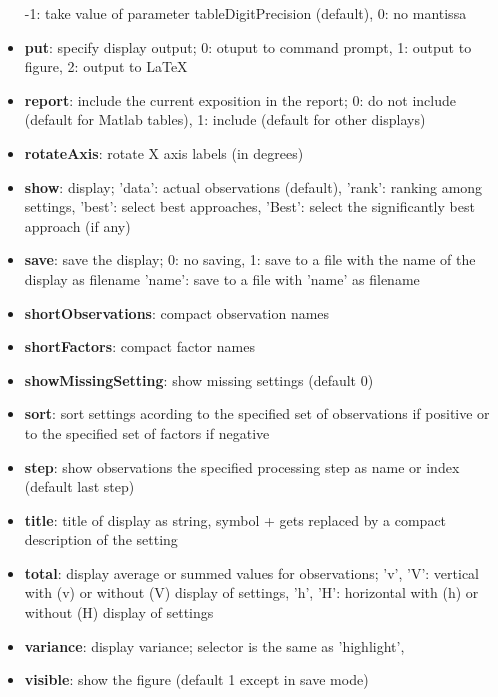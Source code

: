 \documentclass[a4paper,fleqn]{tufte-handout}
\begin{document}
\begin{itemize}
           -1: take value of  parameter tableDigitPrecision (default),
           0: no mantissa                  
\item \textbf{put}: specify display output;
    	0: otuput to command prompt,
    	1: output to figure,
    	2: output to \LaTeX 
\item \textbf{report}:  include the current exposition in the report;
       0: do not include (default for Matlab tables),  
       1: include (default for other displays)                   
\item \textbf{rotateAxis}: rotate X axis labels (in degrees)   
\item \textbf{show}: display;
        'data': actual observations (default),
        'rank': ranking among settings,
        'best': select best approaches,
        'Best': select the significantly best approach (if any)                 
\item \textbf{save}: save the display;
    	0: no saving,
    	1: save to a file with the name of the display as filename
    	'name': save to a file with 'name' as filename
\item \textbf{shortObservations}: compact observation names                 
\item \textbf{shortFactors}: compact factor names  
\item \textbf{showMissingSetting}:  show missing settings (default 0)                
\item \textbf{sort}:   sort settings acording to the specified set of observations if
        positive or to the specified set of factors if negative
\item \textbf{step}: show observations the specified processing step as name or
    index (default last step)                 
\item \textbf{title}: title of display as string,
    	symbol + gets replaced by a compact description of the setting  
\item \textbf{total}:  display average  or summed values for observations;
        'v', 'V': vertical with (v) or without (V) display of settings,
        'h', 'H': horizontal with (h) or without (H) display of settings                
\item \textbf{variance}:   display variance;
    	selector is the same as 'highlight',
\item \textbf{visible}: show the figure (default 1 except in save mode)                    
\end{itemize}
\end{document}
